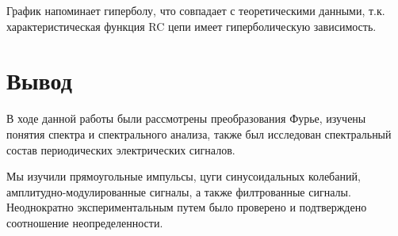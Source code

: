 \documentclass[a4paper,12pt]{article}
\begin{document}
График напоминает гиперболу, что совпадает с теоретическими данными, т.к. характеристическая функция RC цепи имеет гиперболическую зависимость.

\section*{Вывод}
В ходе данной работы были рассмотрены преобразования Фурье, изучены понятия спектра и спектрального анализа, также был исследован спектральный состав периодических электрических сигналов.

Мы изучили прямоугольные импульсы, цуги синусоидальных колебаний, амплитудно-модулированные сигналы, а также филтрованные сигналы. Неоднократно экспериментальным путем было проверено и подтверждено соотношение неопределенности.
\end{document}
